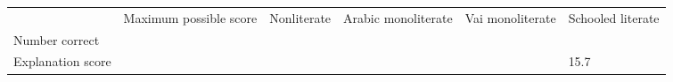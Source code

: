 \begin{flushleft}
\tablehead{}
\begin{supertabular}{m{1.0365599in}m{0.69765985in}m{0.50115985in}m{0.5615598in}m{0.5879598in}m{0.64905983in}}
\hline
 &
Maximum possible score

 &
Nonliterate

 &
Arabic monoliterate

 &
Vai monoliterate

 &
Schooled literate

\\
Number correct

 &
\par

 &
\par

 &
\par

 &
\par

 &
\par

\\
Explanation score

 &
\par

 &
\par

 &
\par

 &
\par

 &
15.7

\\\hline
\end{supertabular}
\end{flushleft}
